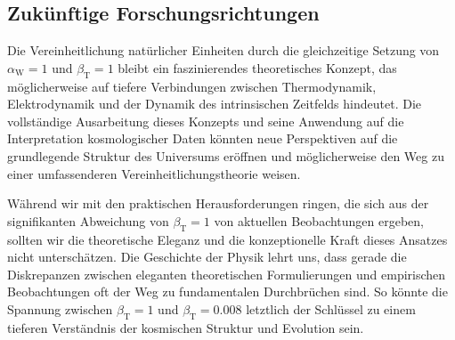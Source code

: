 \documentclass[12pt,a4paper]{article}
\newcommand{\betaT}{\beta_{\text{T}}}
\newcommand{\alphaW}{\alpha_{\text{W}}}
\begin{document}
	\subsection{Zukünftige Forschungsrichtungen}
	

	
	Die Vereinheitlichung natürlicher Einheiten durch die gleichzeitige Setzung von \(\alphaW = 1\) und \(\betaT = 1\) bleibt ein faszinierendes theoretisches Konzept, das möglicherweise auf tiefere Verbindungen zwischen Thermodynamik, Elektrodynamik und der Dynamik des intrinsischen Zeitfelds hindeutet. Die vollständige Ausarbeitung dieses Konzepts und seine Anwendung auf die Interpretation kosmologischer Daten könnten neue Perspektiven auf die grundlegende Struktur des Universums eröffnen und möglicherweise den Weg zu einer umfassenderen Vereinheitlichungstheorie weisen.
	
	Während wir mit den praktischen Herausforderungen ringen, die sich aus der signifikanten Abweichung von \(\betaT = 1\) von aktuellen Beobachtungen ergeben, sollten wir die theoretische Eleganz und die konzeptionelle Kraft dieses Ansatzes nicht unterschätzen. Die Geschichte der Physik lehrt uns, dass gerade die Diskrepanzen zwischen eleganten theoretischen Formulierungen und empirischen Beobachtungen oft der Weg zu fundamentalen Durchbrüchen sind. So könnte die Spannung zwischen \(\betaT = 1\) und \(\betaT = 0.008\) letztlich der Schlüssel zu einem tieferen Verständnis der kosmischen Struktur und Evolution sein.
	
\end{document}
